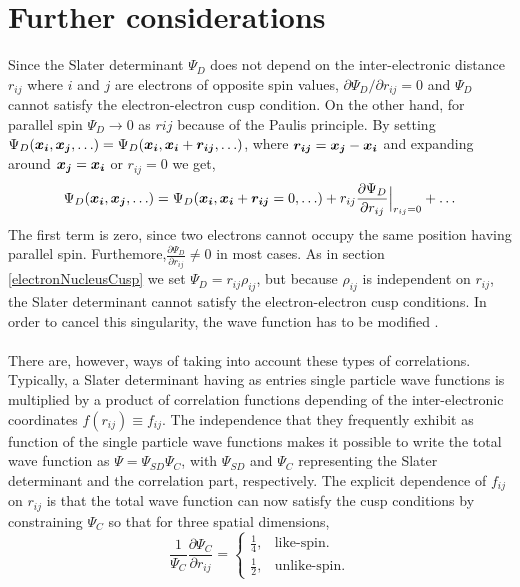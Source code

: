 \section{Further considerations}
Since the Slater determinant $\Psi_D$ does not depend on the inter-electronic distance $r_{ij}$ where $i$ and $j$ are electrons of opposite spin values, $\partial \Psi_D/\partial r_{ij} = 0$ and $\Psi_D$ cannot satisfy the electron-electron cusp condition. On the other hand, for parallel spin $\Psi_D \rightarrow 0$ as $rij$ because of the Paulis principle. By setting $\Psi_D(\boldsymbol{x_i}, \boldsymbol{x_j}, \ldots) = \Psi_D(\boldsymbol{x_i}, \boldsymbol{x_i} + \boldsymbol{r_{ij}}, \ldots)$, where $\boldsymbol{r_{ij}} = \boldsymbol{x_j} - \boldsymbol{x_i}$ and expanding around $\boldsymbol{x_j} = \boldsymbol{x_i}$ or $r_{ij} = 0$ we get,
$$
\Psi_D(\boldsymbol{x_i}, \boldsymbol{x_j}, \ldots) = \Psi_D(\boldsymbol{x_i}, \boldsymbol{x_i} + \boldsymbol{r_{ij}} = 0, \ldots) + r_{ij}\frac{\partial \Psi_D}{\partial r_{ij}}\Big|_{r_{ij} = 0} + \ldots
$$
The first term is zero, since two electrons cannot occupy the same position having parallel spin. Furthemore,$\frac{\partial \Psi_D}{\partial r_{ij}} \neq 0 $ in most cases\cite{Hammond}. As in section \ref{electronNucleusCusp} we set $\Psi_D = r_{ij}\rho_{ij}$, but because $\rho_{ij}$ is independent on $r_{ij}$, the Slater determinant cannot satisfy the electron-electron cusp conditions. 
In order to cancel this singularity, the wave function has to be modified \cite{Hammond,Nesbet2003}.\\
\\
There are, however, ways of taking into account these types of correlations. Typically, a Slater determinant having as entries single particle wave functions is multiplied by a product of correlation functions depending of the inter-electronic coordinates $f(r_{ij}) \equiv f_{ij}$. The independence that they frequently exhibit
as function of  the single particle wave functions makes it possible to write the total wave function as $\Psi = \Psi_{SD} \Psi_{C}$, with $\Psi_{SD}$ and $\Psi_C$ representing the Slater determinant and the correlation part, respectively. The explicit dependence of $f_{ij}$ on $r_{ij}$ is that the total wave function can now satisfy the cusp conditions by constraining $\Psi_C$ so that for three spatial dimensions,
\begin{equation}\label{cusp3D}
\boxed{\frac{1}{\Psi_C}\frac{\partial \Psi_C}{\partial r_{ij}} = \begin{cases} \frac{1}{4}, & \text{like-spin.} \\
\frac{1}{2}, & \text{unlike-spin.}\end{cases}}
\end{equation}
